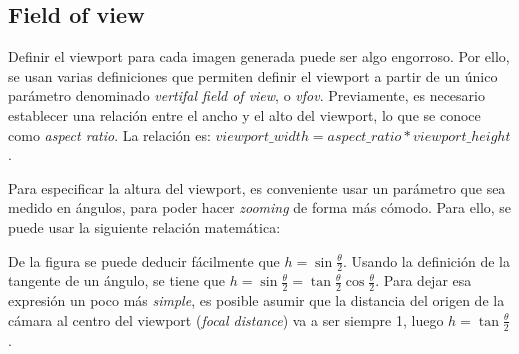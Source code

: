 \documentclass[12pt]{article}
\theoremstyle{definition}
\theoremstyle{remark}
\begin{document}
\subsection{Field of view}

Definir el viewport para cada imagen generada puede ser algo engorroso. Por ello, se usan varias definiciones que permiten definir el viewport a partir de un único parámetro denominado \textit{vertifal field of view}, o \textit{vfov}. Previamente, es necesario establecer una relación entre el ancho y el alto del viewport, lo que se conoce como \textit{aspect ratio}. La relación es: $viewport\_width=aspect\_ratio*viewport\_height$.

Para especificar la altura del viewport, es conveniente usar un parámetro que sea medido en ángulos, para poder hacer \textit{zooming} de forma más cómodo. Para ello, se puede usar la siguiente relación matemática:

\begin{figure}[H]
\centering
{}
\end{figure}

De la figura se puede deducir fácilmente que $h=\sin\frac{\theta}{2}$. Usando la definición de la tangente de un ángulo, se tiene que $h=\sin\frac{\theta}{2}=\tan\frac{\theta}{2}\cos\frac{\theta}{2}$. Para dejar esa expresión un poco más \textit{simple}, es posible asumir que la distancia del origen de la cámara al centro del viewport (\textit{focal distance}) va a ser siempre 1, luego $h=\tan\frac{\theta}{2}$.
\end{document}
